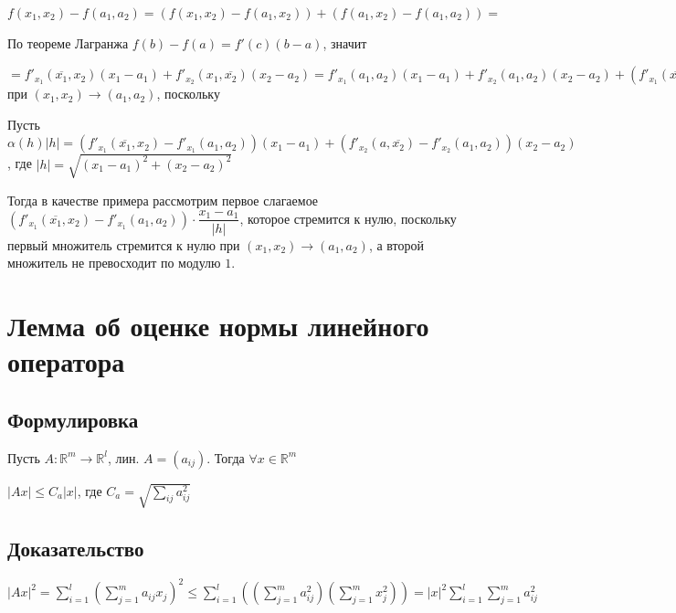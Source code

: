 \documentclass{article}
\begin{document}
            $f(x_1, x_2) - f(a_1, a_2) = \left( f(x_1, x_2) - f(a_1, x_2) \right) + \left(f(a_1, x_2) - f(a_1, a_2) \right) =$ 
            
            По теореме Лагранжа $f(b) - f(a) = f'(c) (b - a)$, значит
            
            $= f'_{x_1} (\overline{x_1}, x_2)(x_1 - a_1) + f'_{x_2}(x_1, \overline{x_2})(x_2 - a_2) = f'_{x_1}(a_1, a_2)(x_1 - a_1) + f'_{x_2} (a_1, a_2)(x_2 - a_2) + (f'_{x_1}(\overline{x_1}, x_2) - f'_{x_1}(a_1, a_2))(x_1 - a_1) + (f'_{x_2}(a, \overline{x_2}) - f'_{x_2}(a_1, a_2))(x_2 - a_2) \rightarrow 0$ при $(x_1, x_2) \rightarrow (a_1, a_2)$, поскольку
            
            Пусть $\alpha(h) |h| = (f'_{x_1}(\overline{x_1}, x_2) - f'_{x_1}(a_1, a_2))(x_1 - a_1) + (f'_{x_2}(a, \overline{x_2}) - f'_{x_2}(a_1, a_2))(x_2 - a_2)$, где $|h| = \sqrt{(x_1 - a_1)^2 + (x_2 - a_2)^2}$
            
            Тогда в качестве примера рассмотрим первое слагаемое $(f'_{x_1}(\overline{x_1}, x_2) - f'_{x_1}(a_1, a_2)) \cdot \dfrac{x_1 - a_1}{|h|}$, которое стремится к нулю, поскольку первый множитель стремится к нулю при $(x_1, x_2) \rightarrow (a_1, a_2)$, а второй множитель не превосходит по модулю $1$.
            
    \newpage
    
    \section{Лемма об оценке нормы линейного оператора}
    
        \subsection{Формулировка}
        
            Пусть $A : \mathbb{R}^m \rightarrow \mathbb{R}^l$, лин. $A = (a_{ij})$. Тогда $\forall x \in \mathbb{R}^m$
            
            $\left| Ax \right| \leq C_a |x|$, где $C_a = \sqrt{\sum\limits_{ij} a^2_{ij}}$
            
        \subsection{Доказательство}
        
            $\left| Ax \right|^2 = \sum\limits^l_{i = 1} \left( \sum\limits^m_{j = 1} a_{ij} x_j \right)^2 \leq \sum\limits^l_{i = 1} \left( \left( \sum\limits^m_{j = 1} a_{ij}^2 \right) \left( \sum\limits^m_{j = 1} x_j^2 \right) \right) = |x|^2 \sum\limits^l_{i = 1} \sum\limits^m_{j = 1} a_{ij}^2$
            
\end{document}

